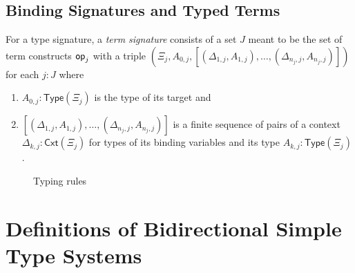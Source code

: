 \documentclass[acmsmall]{acmart}
\begin{document}
\begin{example}[STLC]
  
\end{example}


\subsection{Binding Signatures and Typed Terms}
\begin{definition}
  For a type signature, a \emph{term signature} consists of a set $J$ meant to be the set of term constructs $\mathsf{op}_{j}$ with a triple $\left(\Xi_j, A_{0, j}, \left[\left(\Delta_{1, j}, A_{1, j}\right), \ldots, \left(\Delta_{n_j, j}, A_{n_j, j}\right) \right]\right)$ for each $j:J$ where
  \begin{enumerate}
    \item $A_{0, j} : \mathsf{Type}(\Xi_j)$ is the type of its target and
    \item $\left[\left(\Delta_{1, j}, A_{1, j}\right), \ldots, \left(\Delta_{n_j, j}, A_{n_j, j}\right) \right]$ is a finite sequence of pairs of a context $\Delta_{k, j} : \mathsf{Cxt}(\Xi_j)$ for types of its binding variables and its type $A_{k, j} : \mathsf{Type}(\Xi_j)$.
  \end{enumerate}
\end{definition}
\begin{figure}
  \centering
  
  \caption{Typing rules}
\end{figure}

\begin{example}[STLC]
  
\end{example}

\section{Definitions of Bidirectional Simple Type Systems} 
\end{document}
